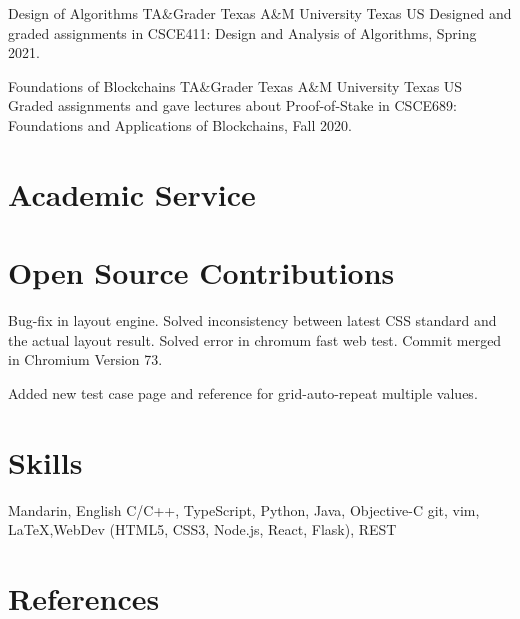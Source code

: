 \documentclass[11pt, a4paper, sans]{moderncv} %
\begin{document}
{Design of Algorithms TA\&Grader}
{Texas A\&M University}
{Texas}
{US}
{Designed and graded assignments in CSCE411: Design and Analysis of Algorithms, Spring 2021.}

{Foundations of Blockchains TA\&Grader}
{Texas A\&M University}
{Texas}
{US}
{Graded assignments and gave lectures about Proof-of-Stake in CSCE689: Foundations and Applications of Blockchains, Fall 2020.}


\section{Academic Service}



\section{Open Source Contributions}

{Bug-fix in layout engine. Solved inconsistency between latest CSS standard and the actual layout result. Solved error in chromum fast web test. Commit merged in Chromium Version 73.}

{Added new test case page and reference for grid-auto-repeat multiple values.}


\section{Skills}

{Mandarin, English}
{C/C++, TypeScript, Python, Java, Objective-C}
{git, vim, \LaTeX,WebDev (HTML5, CSS3, Node.js, React, Flask), REST}


\section{References}

\end{document}
